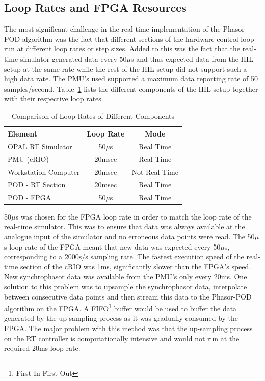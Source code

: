 \documentclass[journal]{IEEEtran}
\begin{document}
\subsection{Loop Rates and FPGA Resources}\label{looprate}
The most significant challenge in the real-time implementation of the Phasor-POD algorithm was the fact that different sections of the hardware control loop run at different loop rates or step sizes. Added to this was the fact that the real-time simulator generated data every 50$\mu$s and thus expected data from the HIL setup at the same rate while the rest of the HIL setup did not support such a high data rate. The PMU\rq{s} used supported a maximum data reporting rate of 50 samples/second. Table~\ref{ex:LoopRates} lists the different components of the HIL setup together with their respective loop rates.
\begin{table}[!ht]
\caption{Comparison of Loop Rates of Different Components}\label{ex:LoopRates}
\begin{center}
\begin{tabular}{|l|c|c|}
\hline \textbf{Element} & \textbf{Loop Rate} & \textbf{Mode} \\
\hline OPAL RT Simulator & 50$\mu$s & Real Time \\ 
\hline PMU (cRIO) & 20msec & Real Time \\ 
\hline Workstation Computer& 20msec & Not Real Time \\ 
\hline POD - RT Section & 20msec & Real Time \\ 
\hline POD - FPGA & 50$\mu$s & Real Time \\ 
\hline 
\end{tabular}
\end{center}
\end{table} 

50$\mu$s was chosen for the FPGA loop rate in order to match the loop rate of the real-time simulator. This was to ensure that data was always available at the analogue input of the simulator and no erroneous data points were read. The 50$\mu$s loop rate of the FPGA meant that new data was expected every 50$\mu$s, corresponding to a 2000s/s sampling rate. The fastest execution speed of the real-time section of the cRIO was 1ms, significantly slower than the FPGA\rq{s} speed. New synchrophasor data was available from the PMU\rq{s} only every 20ms. One solution to this problem was to upsample the synchrophasor data, interpolate between consecutive data points and then stream this data to the Phasor-POD algorithm on the FPGA. A FIFO\footnote{First In First Out} buffer would be used to buffer the data generated by the up-sampling process as it was gradually consumed by the FPGA. The major problem with this method was that the up-sampling process on the RT controller is computationally intensive and would not run at the required 20ms loop rate.\\
\end{document}
